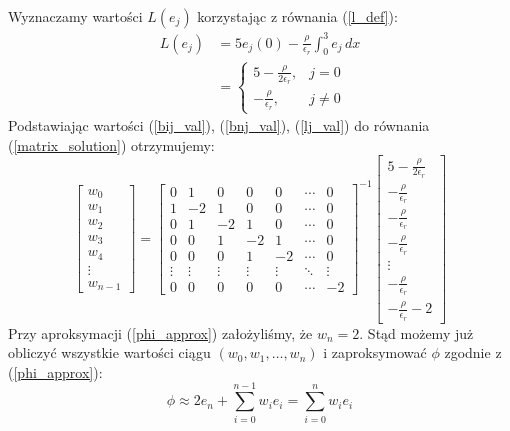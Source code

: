 \documentclass[a4paper,12pt]{article}
\begin{document}
    Wyznaczamy wartości \(L(e_j)\) korzystając z równania (\ref{l_def}):
    \begin{align}
        L(e_j) &= 5e_j(0) - \frac{\rho}{\epsilon_r} \int_{0}^{3} e_j\,dx \nonumber \\
        &=
        \begin{cases}
            5 - \frac{\rho}{2\epsilon_r},& j = 0 \\
            -\frac{\rho}{\epsilon_r},& j \neq 0
        \end{cases} \label{lj_val}
    \end{align}
    Podstawiając wartości (\ref{bij_val}), (\ref{bnj_val}), (\ref{lj_val}) do równania (\ref{matrix_solution}) otrzymujemy:
    \begin{equation}
        \begin{bmatrix}
            w_0 \\
            w_1 \\
            w_2 \\
            w_3 \\
            w_4 \\
            \vdots \\
            w_{n-1}
        \end{bmatrix}
        =
        \begin{bmatrix}
            0 &  1 &  0 &  0 &  0 & \cdots &  0 \\
            1 & -2 &  1 &  0 &  0 & \cdots &  0 \\
            0 &  1 & -2 &  1 &  0 & \cdots &  0 \\
            0 &  0 &  1 & -2 &  1 & \cdots &  0 \\
            0 &  0 &  0 &  1 & -2 & \cdots &  0 \\
            \vdots & \vdots & \vdots & \vdots & \vdots & \ddots & \vdots \\
            0 &  0 &  0 &  0 &  0 & \cdots & -2
        \end{bmatrix}
        ^{-1}
        \begin{bmatrix}
            5 - \frac{\rho}{2\epsilon_r} \\
            -\frac{\rho}{\epsilon_r} \\
            -\frac{\rho}{\epsilon_r} \\
            -\frac{\rho}{\epsilon_r} \\
            \vdots \\
            -\frac{\rho}{\epsilon_r} \\
            -\frac{\rho}{\epsilon_r}-2
        \end{bmatrix} \label{matrix_nums}
    \end{equation}
    Przy aproksymacji (\ref{phi_approx}) założyliśmy, że \(w_n = 2\). Stąd możemy już obliczyć wszystkie wartości ciągu \((w_0, w_1, \ldots, w_n)\) i zaproksymować \(\phi\) zgodnie z (\ref{phi_approx}):
    \begin{equation}
        \phi \approx 2e_n + \sum_{i=0}^{n-1} w_i e_i = \sum_{i=0}^{n} w_i e_i
    \end{equation}
\end{document}
